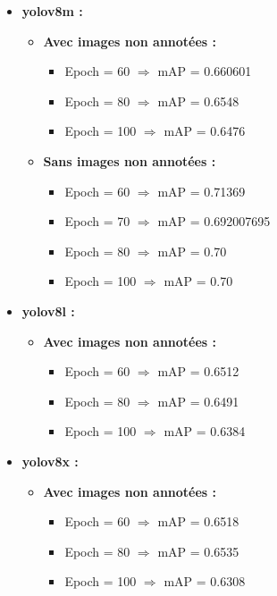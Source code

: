 \begin{itemize}
    \item \textbf{yolov8m :}
          \begin{itemize}
              \item \textbf{Avec images non annotées :}
                    \begin{itemize}
                        \item Epoch = 60 $\Rightarrow$ mAP = 0.660601
                        \item Epoch = 80 $\Rightarrow$ mAP = 0.6548
                        \item Epoch = 100 $\Rightarrow$ mAP = 0.6476
                    \end{itemize}
              \item \textbf{Sans images non annotées :}
                    \begin{itemize}
                        \item Epoch = 60 $\Rightarrow$ mAP = 0.71369
                        \item Epoch = 70 $\Rightarrow$ mAP = 0.692007695
                        \item Epoch = 80 $\Rightarrow$ mAP = 0.70
                        \item Epoch = 100 $\Rightarrow$ mAP = 0.70
                    \end{itemize}
          \end{itemize}

    \item \textbf{yolov8l :}
          \begin{itemize}
              \item \textbf{Avec images non annotées :}
                    \begin{itemize}
                        \item Epoch = 60 $\Rightarrow$ mAP = 0.6512
                        \item Epoch = 80 $\Rightarrow$ mAP = 0.6491
                        \item Epoch = 100 $\Rightarrow$ mAP = 0.6384
                    \end{itemize}
          \end{itemize}

    \item \textbf{yolov8x :}
          \begin{itemize}
              \item \textbf{Avec images non annotées :}
                    \begin{itemize}
                        \item Epoch = 60 $\Rightarrow$ mAP = 0.6518
                        \item Epoch = 80 $\Rightarrow$ mAP = 0.6535
                        \item Epoch = 100 $\Rightarrow$ mAP = 0.6308
                    \end{itemize}
          \end{itemize}
\end{itemize}


